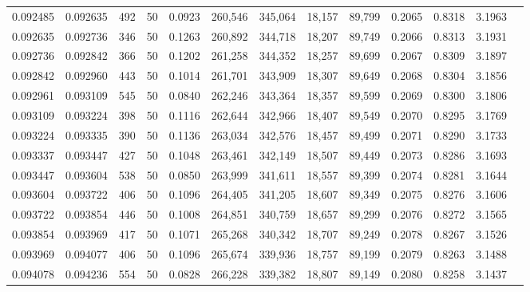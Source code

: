 \begin{tabular}{rrrrrrrrrrrrr}
0.092485 & 0.092635 &   492 &  50 &                                     0.0923 & 260,546 & 345,064 &  18,157 &  89,799 & 0.2065 & 0.8318 & 3.1963 \\
0.092635 & 0.092736 &   346 &  50 &                                     0.1263 & 260,892 & 344,718 &  18,207 &  89,749 & 0.2066 & 0.8313 & 3.1931 \\
0.092736 & 0.092842 &   366 &  50 &                                     0.1202 & 261,258 & 344,352 &  18,257 &  89,699 & 0.2067 & 0.8309 & 3.1897 \\
0.092842 & 0.092960 &   443 &  50 &                                     0.1014 & 261,701 & 343,909 &  18,307 &  89,649 & 0.2068 & 0.8304 & 3.1856 \\
0.092961 & 0.093109 &   545 &  50 &                                     0.0840 & 262,246 & 343,364 &  18,357 &  89,599 & 0.2069 & 0.8300 & 3.1806 \\
0.093109 & 0.093224 &   398 &  50 &                                     0.1116 & 262,644 & 342,966 &  18,407 &  89,549 & 0.2070 & 0.8295 & 3.1769 \\
0.093224 & 0.093335 &   390 &  50 &                                     0.1136 & 263,034 & 342,576 &  18,457 &  89,499 & 0.2071 & 0.8290 & 3.1733 \\
0.093337 & 0.093447 &   427 &  50 &                                     0.1048 & 263,461 & 342,149 &  18,507 &  89,449 & 0.2073 & 0.8286 & 3.1693 \\
0.093447 & 0.093604 &   538 &  50 &                                     0.0850 & 263,999 & 341,611 &  18,557 &  89,399 & 0.2074 & 0.8281 & 3.1644 \\
0.093604 & 0.093722 &   406 &  50 &                                     0.1096 & 264,405 & 341,205 &  18,607 &  89,349 & 0.2075 & 0.8276 & 3.1606 \\
0.093722 & 0.093854 &   446 &  50 &                                     0.1008 & 264,851 & 340,759 &  18,657 &  89,299 & 0.2076 & 0.8272 & 3.1565 \\
0.093854 & 0.093969 &   417 &  50 &                                     0.1071 & 265,268 & 340,342 &  18,707 &  89,249 & 0.2078 & 0.8267 & 3.1526 \\
0.093969 & 0.094077 &   406 &  50 &                                     0.1096 & 265,674 & 339,936 &  18,757 &  89,199 & 0.2079 & 0.8263 & 3.1488 \\
0.094078 & 0.094236 &   554 &  50 &                                     0.0828 & 266,228 & 339,382 &  18,807 &  89,149 & 0.2080 & 0.8258 & 3.1437 \\

\end{tabular}
